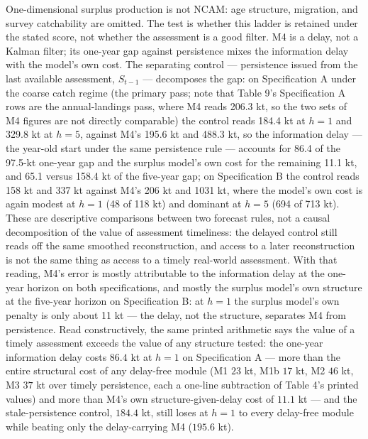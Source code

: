 \documentclass[11pt]{article}
\begin{document}
One-dimensional surplus production is not NCAM: age structure,
migration, and survey catchability are omitted. The test is whether this
ladder is retained under the stated score, not whether the assessment is
a good filter. M4 is a delay, not a Kalman filter; its one-year gap
against persistence mixes the information delay with the model's own
cost. The separating control --- persistence issued from the last
available assessment, \(S_{t-1}\) --- decomposes the gap: on
Specification A under the coarse catch regime (the primary pass; note
that Table 9's Specification A rows are the annual-landings pass, where
M4 reads 206.3 kt, so the two sets of M4 figures are not directly
comparable) the control reads 184.4 kt at \(h = 1\) and 329.8 kt at
\(h = 5\), against M4's 195.6 kt and 488.3 kt, so the information delay
--- the year-old start under the same persistence rule --- accounts for
86.4 of the 97.5-kt one-year gap and the surplus model's own cost for
the remaining 11.1 kt, and 65.1 versus 158.4 kt of the five-year gap; on
Specification B the control reads 158 kt and 337 kt against M4's 206 kt
and 1031 kt, where the model's own cost is again modest at \(h = 1\) (48
of 118 kt) and dominant at \(h = 5\) (694 of 713 kt). These are descriptive comparisons between two
forecast rules, not a causal decomposition of the value of assessment
timeliness: the delayed control still reads off the same smoothed
reconstruction, and access to a later reconstruction is not the same
thing as access to a timely real-world assessment. With that reading,
M4's error is mostly attributable to the information delay at the
one-year horizon on both specifications, and mostly the surplus model's own structure at the
five-year horizon on Specification B: at \(h = 1\) the surplus model's
own penalty is only about 11 kt --- the delay, not the structure,
separates M4 from persistence. Read constructively, the same printed
arithmetic says the value of a timely assessment exceeds the value of
any structure tested: the one-year information delay costs \(86.4\) kt
at \(h = 1\) on Specification A --- more than the entire structural cost
of any delay-free module (M1 \(23\) kt, M1b \(17\) kt, M2 \(46\) kt, M3
\(37\) kt over timely persistence, each a one-line subtraction of Table
4's printed values) and more than M4's own structure-given-delay cost of
\(11.1\) kt --- and the stale-persistence control, \(184.4\) kt, still
loses at \(h = 1\) to every delay-free module while beating only the
delay-carrying M4 (\(195.6\) kt).
\end{document}

